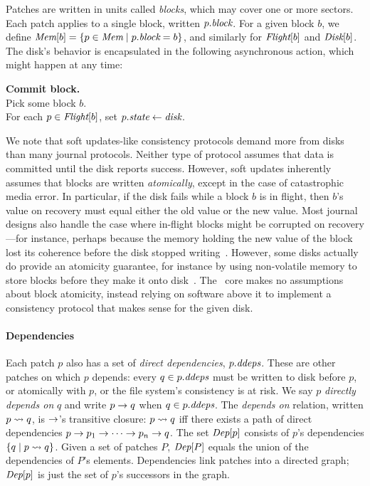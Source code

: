 Patches are written in units called \emph{blocks}, which may cover one or
more sectors.
%
Each patch applies to a single block, written $p.\textit{block}$.
%
For a given block $b$, we define $\PMem[b] = \{p \in \PMem \mid \PBlock{p}
= b \}$, and similarly for $\PInf[b]$ and $\PDisk[b]$.
%
The disk's behavior is encapsulated in the following asynchronous action,
which might happen at any time:

\begin{tabbing}
\quad \textbf{Commit block.} \\
\qquad Pick some block $b$. \\
\qquad For each $p \in \PInf[b]$, set $p.\textit{state} \gets \textit{disk}$.
\end{tabbing}


We note that soft updates-like consistency protocols demand more from disks
than many journal protocols.
%
Neither type of protocol assumes that data is committed until the disk
reports success.
%
However, soft updates inherently assumes that blocks are written
\emph{atomically}, except in the case of catastrophic media error.
%
In particular, if the disk fails while a block $b$ is in flight, then $b$'s
value on recovery must equal either the old value or the new value.
%
Most journal designs also handle the case where in-flight blocks might be
corrupted on recovery---for instance, perhaps because the memory holding
the new value of the block lost its coherence before the disk stopped
writing~\cite{tso}.
%
However, some disks actually do provide an atomicity guarantee, for
instance by using non-volatile memory to store blocks before they make it
onto disk~\cite{???}.
%
The \Kudos\ core makes no assumptions about block atomicity, instead relying
on software above it to implement a consistency protocol that makes sense
for the given disk.


\paragraph{Dependencies}
%
Each patch $p$ also has a set of \emph{direct dependencies}, $\PDDepset{p}$.
%
These are other patches on which $p$ depends: every $q \in \PDDepset{p}$
must be written to disk before $p$, or atomically with $p$, or the file
system's consistency is at risk.
%
We say $p$ \emph{directly depends on} $q$ and write $p \rightarrow q$ when $q
\in \PDDepset{p}$.
%
The \emph{depends on} relation, written $p \leadsto q$, is $\rightarrow$'s
transitive closure: $p \leadsto q$ iff there exists a path of direct
dependencies $p \rightarrow p_1 \rightarrow \cdots \rightarrow p_n \rightarrow q$.
%
The set $\textit{Dep}[p]$ consists of $p$'s dependencies $\{q \mid p \leadsto
q \}$.
%
Given a set of patches $P$, $\textit{Dep}[P]$ equals the union of the
dependencies of $P$'s elements.
%
Dependencies link patches into a directed graph; $\textit{Dep}[p]$ is just the
set of $p$'s successors in the graph.



